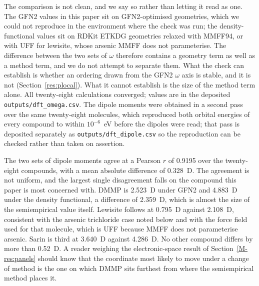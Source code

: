 \documentclass[journal=jacsat,manuscript=suppinfo,margin=1in]{achemso}
\begin{document}
The comparison is not clean, and we say so rather than letting it read as one.
The GFN2 values in this paper sit on GFN2-optimised geometries, which we could
not reproduce in the environment where the check was run; the density-functional
values sit on RDKit ETKDG geometries relaxed with MMFF94, or with UFF for
lewisite, whose arsenic MMFF does not parameterise. The difference between the
two sets of $\omega$ therefore contains a geometry term as well as a method
term, and we do not attempt to separate them. What the check can establish is
whether an ordering drawn from the GFN2 $\omega$ axis is stable, and it is not
(Section~\ref{res:plocal}). What it cannot establish is the size of the method
term alone. All twenty-eight calculations converged; values are in the deposited
\texttt{outputs/dft\_omega.csv}. The dipole moments were obtained in a second
pass over the same twenty-eight molecules, which reproduced both orbital
energies of every compound to within $10^{-6}$~eV before the dipoles were read;
that pass is deposited separately as \texttt{outputs/dft\_dipole.csv} so the
reproduction can be checked rather than taken on assertion.

The two sets of dipole moments agree at a Pearson $r$ of 0.9195 over the
twenty-eight compounds, with a mean absolute difference of 0.328~D. The
agreement is not uniform, and the largest single disagreement falls on the
compound this paper is most concerned with. DMMP is 2.523~D under GFN2 and
4.883~D under the density functional, a difference of 2.359~D, which is
almost the size of the semiempirical value itself. Lewisite follows at
0.795~D against 2.108~D, consistent with the arsenic trichloride case noted
below and with the force field used for that molecule, which is UFF because
MMFF does not parameterise arsenic. Sarin is third at 3.640~D against
4.286~D. No other compound differs by more than 0.52~D. A reader weighing
the electronic-space result of Section~\ref{M-res:panels} should know that
the coordinate most likely to move under a change of method is the one on
which DMMP sits furthest from where the semiempirical method places it.
\end{document}
